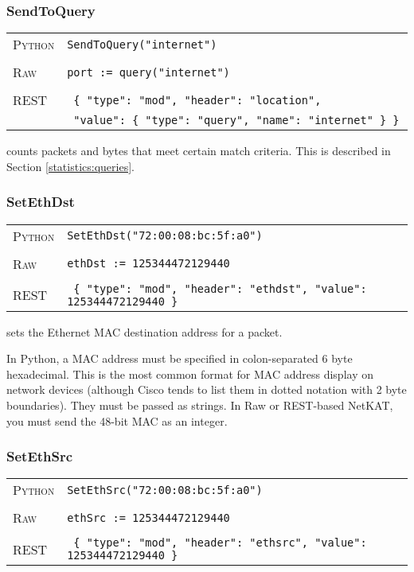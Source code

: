 \subsubsection{SendToQuery}

\bigskip
\begin{tabularx}{\linewidth}{lX}
\textsc{Python}   & \texttt{SendToQuery("internet")} \\ \\
\textsc{Raw}    & \texttt{port := query("internet")}     \\ \\
\textsc{REST} & \texttt{ \{ "type": "mod", "header": "location", } \\
 & \texttt{ "value": \{ "type": "query", "name": "internet" \} \} } 
\end{tabularx}

 counts packets and bytes that meet certain match criteria.  This is described in
Section \ref{statistics:queries}.   


\subsubsection{SetEthDst}

\bigskip
\begin{tabularx}{\linewidth}{lX}
\textsc{Python}   & \texttt{SetEthDst("72:00:08:bc:5f:a0")} \\ \\
\textsc{Raw}    & \texttt{ethDst := 125344472129440}     \\ \\
\textsc{REST} & \texttt{ \{ "type": "mod", "header": "ethdst", "value": 125344472129440 \} }
\end{tabularx}

 sets the Ethernet MAC destination address for a packet.    

In Python, a MAC address must be specified in colon-separated 6 byte hexadecimal.  This is the most common format
for MAC address display on network devices (although Cisco tends to list them in dotted notation with 2 byte
boundaries).  They must be passed as strings.  In Raw or REST-based NetKAT, you must send the 48-bit MAC as 
an integer.  

\subsubsection{SetEthSrc}

\bigskip
\begin{tabularx}{\linewidth}{lX}
\textsc{Python}   & \texttt{SetEthSrc("72:00:08:bc:5f:a0")} \\ \\
\textsc{Raw}    & \texttt{ethSrc := 125344472129440}     \\ \\
\textsc{REST} & \texttt{ \{ "type": "mod", "header": "ethsrc", "value": 125344472129440 \} }
\end{tabularx}

